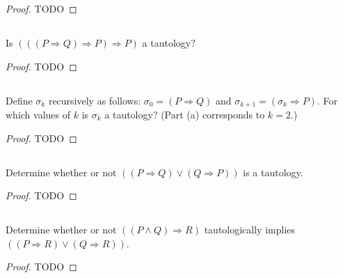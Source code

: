 \documentclass{report}
\begin{document}
  \begin{proof}
    TODO
  \end{proof}

\subsection{}%

  Is $(((P \Rightarrow Q) \Rightarrow P) \Rightarrow P)$ a tautology?

  \begin{proof}
    TODO
  \end{proof}

\subsection{}%

  Define $\sigma_k$ recursively as follows: $\sigma_0 = (P \Rightarrow Q)$ and
    $\sigma_{k + 1} = (\sigma_k \Rightarrow P)$. For which values of $k$ is
    $\sigma_k$ a tautology? (Part (a) corresponds to $k = 2$.)

  \begin{proof}
    TODO
  \end{proof}

\subsection{}%

  Determine whether or not $((P \Rightarrow Q) \lor (Q \Rightarrow P))$ is a
    tautology.

  \begin{proof}
    TODO
  \end{proof}

\subsection{}%

  Determine whether or not $((P \land Q) \Rightarrow R)$ tautologically implies
    $((P \Rightarrow R) \lor (Q \Rightarrow R))$.

  \begin{proof}
    TODO
  \end{proof}

\subsection{}%
\end{document}
